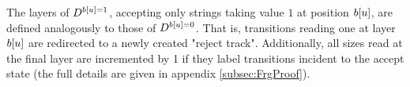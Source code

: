 

The layers of $D^{b[u]=1}$, accepting only strings taking value $1$ at position $b[u]$, are defined analogously to those of $D^{b[u]=0}$. That is, transitions reading one at layer $b[u]$ are redirected to a newly created "reject track". Additionally, all sizes read at the final layer are incremented by 1 if they label transitions incident to the accept state (the full details are given in appendix \ref{subsec:FrgProof}).  



